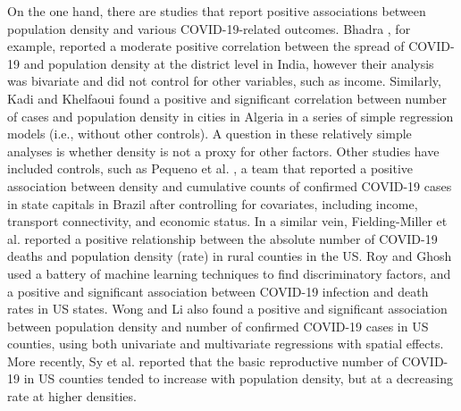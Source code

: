 \documentclass[preprint, 3p,
authoryear]{elsarticle} %
\begin{document}
On the one hand, there are studies that report positive associations
between population density and various COVID-19-related outcomes. Bhadra
\citeyearpar{Bhadra2021impact}, for example, reported a moderate
positive correlation between the spread of COVID-19 and population
density at the district level in India, however their analysis was
bivariate and did not control for other variables, such as income.
Similarly, Kadi and Khelfaoui \citeyearpar{Kadi2020population} found a
positive and significant correlation between number of cases and
population density in cities in Algeria in a series of simple regression
models (i.e., without other controls). A question in these relatively
simple analyses is whether density is not a proxy for other factors.
Other studies have included controls, such as Pequeno et al.
\citeyearpar{Pequeno2020air}, a team that reported a positive
association between density and cumulative counts of confirmed COVID-19
cases in state capitals in Brazil after controlling for covariates,
including income, transport connectivity, and economic status. In a
similar vein, Fielding-Miller et al. \citeyearpar{Fielding2020social}
reported a positive relationship between the absolute number of COVID-19
deaths and population density (rate) in rural counties in the US. Roy
and Ghosh \citeyearpar{Roy2020factors} used a battery of machine
learning techniques to find discriminatory factors, and a positive and
significant association between COVID-19 infection and death rates in US
states. Wong and Li \citeyearpar{Wong2020spreading} also found a
positive and significant association between population density and
number of confirmed COVID-19 cases in US counties, using both univariate
and multivariate regressions with spatial effects. More recently, Sy et
al. \citeyearpar{Sy2021population} reported that the basic reproductive
number of COVID-19 in US counties tended to increase with population
density, but at a decreasing rate at higher densities.
\end{document}
